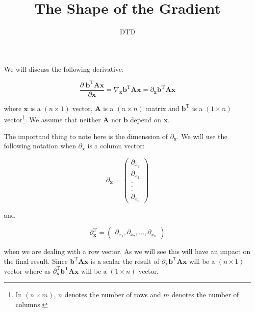 \documentclass{article}
\title{The Shape of the Gradient}
\author{DTD}
\begin{document}
\maketitle

We will discuss the following derivative:

\begin{equation}
\frac{\partial \; \textbf{b}^\text{T} \textbf{A} \textbf{x}}{\partial \textbf{x}} = \nabla_{\textbf{x}} \textbf{b}^\text{T} \textbf{A} \textbf{x} = \partial_\textbf{x} \textbf{b}^\text{T} \textbf{A} \textbf{x}
\end{equation}

\noindent where $\textbf{x}$ is a $(n \times 1)$ vector, $\textbf{A}$ is a $(n \times n)$ matrix and $\textbf{b}^\text{T}$ is a $(1 \times n)$ vector\footnote{In $(n \times m)$, $n$ denotes the number of rows and $m$ denotes the number of columns.}. We assume that neither $\textbf{A}$ nor $\textbf{b}$ depend on $\textbf{x}$. 

The importand thing to note here is the dimenssion of $\partial_\textbf{x}$. We will use the following notation when $\partial_\textbf{x}$ is a column vector:

\begin{equation}
\partial_\textbf{x} = \begin{pmatrix} \partial_{x_1} \\ \partial_{x_2} \\ .\\ .\\ .\\  \partial_{x_n} \end{pmatrix}
\end{equation}

\noindent and

\begin{equation}
\partial^\text{T}_\textbf{x} = \begin{pmatrix} \partial_{x_1} , \partial_{x_2} , . . .,  \partial_{x_n} \end{pmatrix}
\end{equation}

\noindent when we are dealing with a row vector. As we will see this will have an impact on the final result. Since $\textbf{b}^\text{T} \textbf{A} \textbf{x}$ is a scalar the result of $\partial_\textbf{x} \textbf{b}^\text{T} \textbf{A} \textbf{x}$ will be a $(n \times 1)$ vector where as $\partial^\text{T}_\textbf{x} \textbf{b}^\text{T} \textbf{A} \textbf{x}$ will be a $(1 \times n)$ vector.
\end{document}

